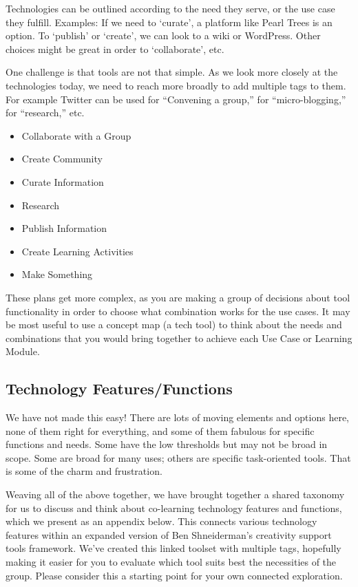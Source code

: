 Technologies can be outlined according to the need they serve, or the
use case they fulfill. Examples: If we need to `curate', a platform like
Pearl Trees is an option. To `publish' or `create', we can look to a
wiki or WordPress. Other choices might be great in order to
`collaborate', etc.

One challenge is that tools are not that simple. As we look more closely
at the technologies today, we need to reach more broadly to add multiple
tags to them. For example Twitter can be used for ``Convening a group,''
for ``micro-blogging,'' for ``research,'' etc.

\begin{itemize}
\tightlist
\item
  Collaborate with a Group
\item
  Create Community
\item
  Curate Information
\item
  Research
\item
  Publish Information
\item
  Create Learning Activities
\item
  Make Something
\end{itemize}

These plans get more complex, as you are making a group of decisions
about tool functionality in order to choose what combination works for
the use cases. It may be most useful to use a concept map (a tech tool)
to think about the needs and combinations that you would bring together
to achieve each Use Case or Learning Module.

\hypertarget{technology-featuresfunctions}{%
\subsection{Technology
Features/Functions}\label{technology-featuresfunctions}}

We have not made this easy! There are lots of moving elements and
options here, none of them right for everything, and some of them
fabulous for specific functions and needs. Some have the low thresholds
but may not be broad in scope. Some are broad for many uses; others are
specific task-oriented tools. That is some of the charm and frustration.

Weaving all of the above together, we have brought together a shared
taxonomy for us to discuss and think about co-learning technology
features and functions, which we present as an appendix below. This
connects various technology features within an expanded version of Ben
Shneiderman's creativity support tools framework. We've created this
linked toolset with multiple tags, hopefully making it easier for you to
evaluate which tool suits best the necessities of the group. Please
consider this a starting point for your own connected exploration.

